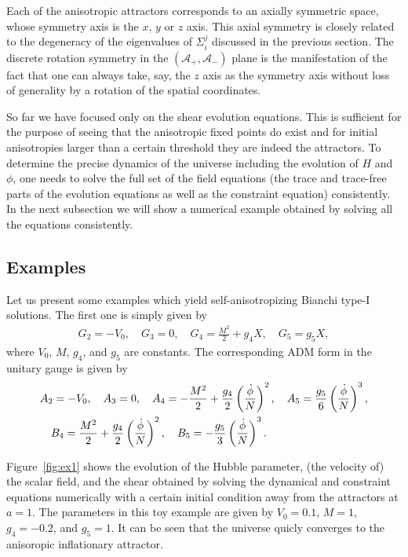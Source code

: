 \documentclass[aps,prd,preprint,superscriptaddress,nofootinbib,tightenlines]{revtex4-1}
\begin{document}
Each of the anisotropic attractors corresponds to an axially symmetric space,
whose symmetry axis is the $x$, $y$ or $z$ axis.
This axial symmetry is closely related to the degeneracy of the eigenvalues of $\Sigma_i^j$
discussed in the previous section.
The discrete rotation symmetry in the $(\mathcal{A}_+,\mathcal{A}_-)$
plane is the manifestation of the fact that
one can always take, say, the $z$ axis as the symmetry axis
without loss of generality by a rotation of the spatial coordinates.


So far we have focused only on the shear evolution equations.
This is sufficient for the purpose of seeing that
the anisotropic fixed points do exist and
for initial anisotropies larger than a certain threshold
they are indeed the attractors.
To determine the precise dynamics of the universe
including the evolution of $H$ and $\phi$, one needs to
solve the full set of the field equations
(the trace and trace-free parts of the evolution equations
as well as the constraint equation) consistently.
In the next subsection we will show a
numerical example obtained by
solving all the equations consistently.




\subsection{Examples}

Let us present some examples which yield self-anisotropizing
Bianchi type-I solutions. The first one is simply given by
\begin{align}
G_2=-V_0,\quad G_3=0,
\quad G_4=\frac{M^2}{2}+g_4X,\quad G_5=g_5X,
\end{align}
where $V_0$, $M$, $g_4$, and $g_5$ are constants.
The corresponding ADM form in the unitary gauge is given by
\begin{align}
&A_2=-V_0,\quad A_3=0,\quad
A_4=-\frac{M^2}{2}+\frac{g_4}{2}\left(\frac{\dot\phi}{N}\right)^2,
\quad A_5=\frac{g_5}{6}\left(\frac{\dot\phi}{N}\right)^3,
\notag \\ &
\quad B_4=\frac{M^2}{2}+\frac{g_4}{2}\left(\frac{\dot\phi}{N}\right)^2,
\quad B_5=-\frac{g_5}{3}\left(\frac{\dot\phi}{N}\right)^3.
\end{align}



Figure~\ref{fig:ex1} shows the evolution of the Hubble parameter,
(the velocity of) the scalar field, and the shear
obtained by solving the dynamical and constraint equations numerically
with a certain initial condition away from the attractors at $a=1$.
The parameters in this toy example are given by
$V_0=0.1$, $M=1$, $g_4=-0.2$, and $g_5=1$.
It can be seen that the universe quicly converges to
the anisoropic inflationary attractor.
\end{document}
